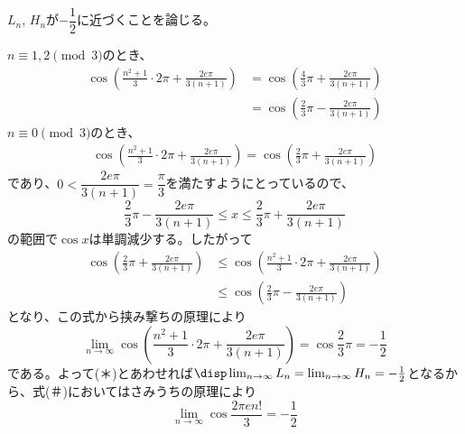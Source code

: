 $L_n$, $H_n$が$-\dfrac{1}{2}$に近づくことを論じる。

$n\equiv 1, 2 \pmod{3}$のとき、
\begin{align*}
 \cos\left(\frac{n^2+1}{3}\cdot 2\pi+\frac{2e\pi}{3(n+1)}\right)&=\cos\left(\frac{4}{3}\pi+\frac{2e\pi}{3(n+1)}\right) \\
 &=\cos\left(\frac{2}{3}\pi-\frac{2e\pi}{3(n+1)}\right)
\end{align*}
$n\equiv 0 \pmod{3}$のとき、
\begin{align*}
 \cos\left(\frac{n^2+1}{3}\cdot 2\pi+\frac{2e\pi}{3(n+1)}\right)=\cos\left(\frac{2}{3}\pi+\frac{2e\pi}{3(n+1)}\right)
\end{align*}
であり、$0<\dfrac{2e\pi}{3(n+1)}=\dfrac{\pi}{3}$を満たすようにとっているので、
\[ \dfrac{2}{3}\pi-\dfrac{2e\pi}{3(n+1)}\le x\le \dfrac{2}{3}\pi+\dfrac{2e\pi}{3(n+1)} \]
の範囲で$\cos x$は単調減少する。したがって
\begin{align*}
 \cos\left(\frac{2}{3}\pi+\frac{2e\pi}{3(n+1)}\right)&\le \cos\left(\frac{n^2+1}{3}\cdot 2\pi+\frac{2e\pi}{3(n+1)}\right) \\
 &\le \cos\left(\frac{2}{3}\pi-\frac{2e\pi}{3(n+1)}\right)
\end{align*}
となり、この式から挟み撃ちの原理により
\[ \lim_{n\to\infty}\cos\left(\frac{n^2+1}{3}\cdot 2\pi+\frac{2e\pi}{3(n+1)}\right)=\cos\frac{2}{3}\pi=-\frac{1}{2} \]
である。よって(＊)とあわせれば$\disp \lim_{n\to\infty}L_n=\lim_{n\to\infty}H_n=-\frac{1}{2}$となるから、式(＃)においてはさみうちの原理により
\[ \lim_{n\to\infty} \cos\frac{2\pi e n!}{3}=-\frac{1}{2} \]